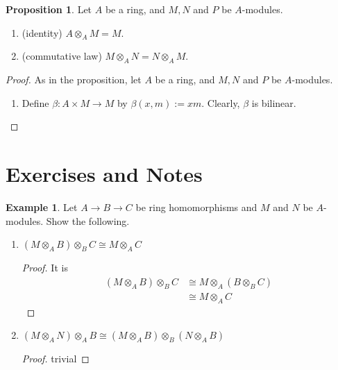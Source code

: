 \documentclass[a4paper]{book}
\theoremstyle{definition}
\newtheorem{example}{Example}[definition]
\newtheorem{proposition}[definition]{Proposition}
\begin{document}
\begin{thmbox}
    \begin{proposition}
        Let \(A\) be a ring, and \(M, N\) and \(P\) be \(A\)-modules.
        \begin{enumerate}
            \item (identity) \(A \otimes_A M = M\).
            \item (commutative law) \(M \otimes_A N = N \otimes_A M\).
        \end{enumerate}
    \end{proposition}
\end{thmbox}
\begin{proof}
    As in the proposition, let \(A\) be a ring, and \(M, N\) and \(P\) be \(A\)-modules.
    \begin{enumerate}
        \item Define \(\beta: A \times M \rightarrow M\) by \(\beta(x, m) := xm\). Clearly, \(\beta\) is bilinear.
    \end{enumerate}
\end{proof}


\newpage
\section{Exercises and Notes}

\begin{example}
    Let \(A \rightarrow B \rightarrow C\) be ring homomorphisms and \(M\) and \(N\) be \(A\)-modules. Show the following.
    \begin{enumerate}
        \item \((M \otimes_A B) \otimes_B C \cong M \otimes_A C\)
        
        \begin{proof}
            It is
            \begin{align*}
                (M \otimes_A B) \otimes_B C & \cong M \otimes_A (B \otimes_B C) \\
                & \cong M \otimes_A C
            \end{align*}
        \end{proof}

        \item \((M \otimes_A N) \otimes_A B \cong (M \otimes_A B) \otimes_B (N \otimes_A B)\)
        
        \begin{proof}
            trivial
        \end{proof}
    \end{enumerate}
\end{example}
\end{document}

